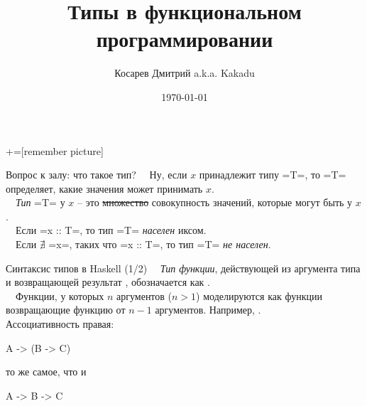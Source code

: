 \documentclass{beamer}
\title[Занятие 1: типы]{Типы в функциональном программировании}
\author{Косарев Дмитрий a.k.a. Kakadu}
\institute{матмех СПбГУ}
\date{\today}
\begin{document}
\maketitle

+=[remember picture]

\everymath{\displaystyle}


\begin{frame}[fragile]{Вопрос к залу: что такое тип?}
\pause
~\ Ну, если $x$ принадлежит типу \inline=T=, то \inline=T= определяет, какие значения может принимать $x$.
\\ \vspace{0.5cm} %
~\ \emph{Тип} \inline=T= у $x$ -- это \sout{множество} совокупность значений, которые могут быть у $x$.
\vspace{0.5cm} \\ %
~\  Если \inline=x :: T=, то тип \inline=T= \emph{населен} иксом.
\\ \vspace{0.5cm} %
~\ Если $\nexists$ \inline=x=, таких что \inline=x :: T=, то тип \inline=T= \emph{не населен}.
\end{frame}

\begin{frame}[fragile]{Синтаксис типов в Haskell (1/2)}
~\ \emph{Тип функции}, действующей из аргумента типа  и возвращающей результат , обозначается как .
\\ \pause
~\ Функции, у которых $n$ аргументов ($n>1$) моделируются как функции возвращающие функцию от $n-1$ аргументов. Например, . \\
\pause 
\vspace{1cm}
Ассоциативность правая:
\begin{hslisting}
A -> (B -> C) 
\end{hslisting}
то же самое, что и
\begin{hslisting}
A -> B -> C
\end{hslisting}
\end{frame}
\end{document}
